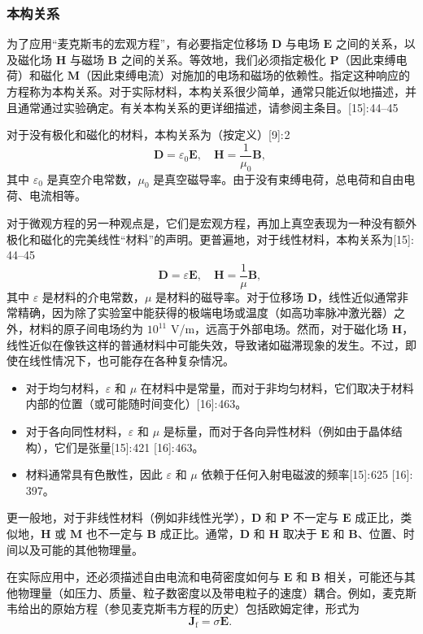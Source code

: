 \subsubsection{本构关系}  
为了应用“麦克斯韦的宏观方程”，有必要指定位移场 \(\mathbf{D}\) 与电场 \(\mathbf{E}\) 之间的关系，以及磁化场 \(\mathbf{H}\) 与磁场 \(\mathbf{B}\) 之间的关系。等效地，我们必须指定极化 \(\mathbf{P}\)（因此束缚电荷）和磁化 \(\mathbf{M}\)（因此束缚电流）对施加的电场和磁场的依赖性。指定这种响应的方程称为本构关系。对于实际材料，本构关系很少简单，通常只能近似地描述，并且通常通过实验确定。有关本构关系的更详细描述，请参阅主条目。[15]: 44–45  

对于没有极化和磁化的材料，本构关系为（按定义）[9]: 2  
\[
\mathbf{D} = \varepsilon_0 \mathbf{E} ,
\quad \mathbf{H} = \frac{1}{\mu_0} \mathbf{B},~
\]  
其中 \(\varepsilon_0\) 是真空介电常数，\(\mu_0\) 是真空磁导率。由于没有束缚电荷，总电荷和自由电荷、电流相等。

对于微观方程的另一种观点是，它们是宏观方程，再加上真空表现为一种没有额外极化和磁化的完美线性“材料”的声明。更普遍地，对于线性材料，本构关系为[15]: 44–45  
\[
\mathbf{D} = \varepsilon \mathbf{E}, \quad \mathbf{H} = \frac{1}{\mu} \mathbf{B},~
\]  
其中 \(\varepsilon\) 是材料的介电常数，\(\mu\) 是材料的磁导率。对于位移场 \(\mathbf{D}\)，线性近似通常非常精确，因为除了实验室中能获得的极端电场或温度（如高功率脉冲激光器）之外，材料的原子间电场约为 \(10^{11}\) V/m，远高于外部电场。然而，对于磁化场 \(\mathbf{H}\)，线性近似在像铁这样的普通材料中可能失效，导致诸如磁滞现象的发生。不过，即使在线性情况下，也可能存在各种复杂情况。
\begin{itemize}
\item 对于均匀材料，\(\varepsilon\) 和 \(\mu\) 在材料中是常量，而对于非均匀材料，它们取决于材料内部的位置（或可能随时间变化）[16]: 463。  
\item 对于各向同性材料，\(\varepsilon\) 和 \(\mu\) 是标量，而对于各向异性材料（例如由于晶体结构），它们是张量[15]: 421 [16]: 463。  
\item 材料通常具有色散性，因此 \(\varepsilon\) 和 \(\mu\) 依赖于任何入射电磁波的频率[15]: 625 [16]: 397。 
\end{itemize} 
更一般地，对于非线性材料（例如非线性光学），\(\mathbf{D}\) 和 \(\mathbf{P}\) 不一定与 \(\mathbf{E}\) 成正比，类似地，\(\mathbf{H}\) 或 \(\mathbf{M}\) 也不一定与 \(\mathbf{B}\) 成正比。通常，\(\mathbf{D}\) 和 \(\mathbf{H}\) 取决于 \(\mathbf{E}\) 和 \(\mathbf{B}\)、位置、时间以及可能的其他物理量。

在实际应用中，还必须描述自由电流和电荷密度如何与 \(\mathbf{E}\) 和 \(\mathbf{B}\) 相关，可能还与其他物理量（如压力、质量、粒子数密度以及带电粒子的速度）耦合。例如，麦克斯韦给出的原始方程（参见麦克斯韦方程的历史）包括欧姆定律，形式为  
\[
\mathbf{J}_{\text{f}} = \sigma \mathbf{E}.~
\]
